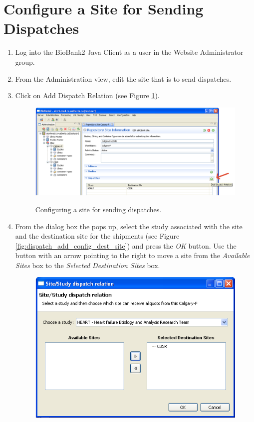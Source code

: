 \section{Configure a Site for Sending Dispatches}
\label{sec:config_send}
\begin{enumerate}
  \item Log into the BioBank2 Java Client as a user in the Website
    Administrator group.
  \item From the Administration view, edit the site that is to send dispatches.
  \item \label{add_dispatch} Click on Add Dispatch Relation (see Figure
    \ref{fig:dispatch_add_configuration}).
    \begin{figure}[H]
      \centering
      \scalebox{0.5}
      { \includegraphics*{screenshots/dispatch/add_config} }
      \caption{Configuring a site for sending dispatches.}
      \label{fig:dispatch_add_configuration}
    \end{figure}
  \item From the dialog box the pops up, select the study associated with the
    site and the destination site for the shipments (see Figure
    \ref{fig:dispatch_add_config_dest_site}) and press the \emph{OK}
    button. Use the button with an arrow pointing to the right to move a site
    from the \emph{Available Sites} box to the \emph{Selected Destination Sites}
    box.
    \begin{figure}[H]
      \centering
      \scalebox{0.5}
      { \includegraphics*{screenshots/dispatch/add_config_dest_site} }

\end{figure}
\end{enumerate}
